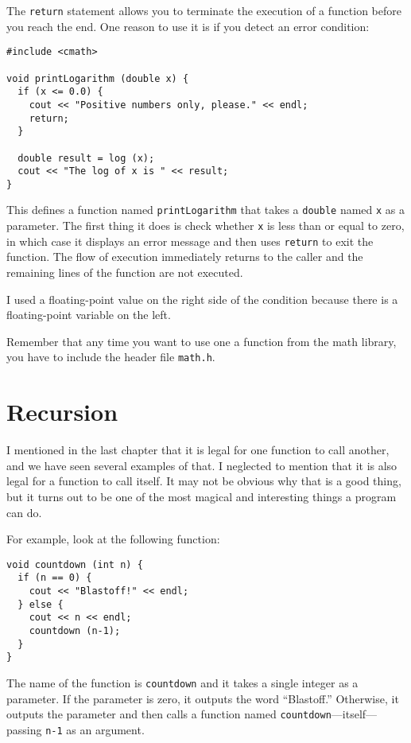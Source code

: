 The {\tt return} statement allows you to terminate the execution
of a function before you reach the end.  One reason to use it
is if you detect an error condition:

\begin{verbatim}
#include <cmath>

void printLogarithm (double x) {
  if (x <= 0.0) {
    cout << "Positive numbers only, please." << endl;
    return;
  }

  double result = log (x);
  cout << "The log of x is " << result;
}
\end{verbatim}
%
This defines a function named {\tt printLogarithm} that takes
a {\tt double} named {\tt x} as a parameter.  The first thing
it does is check whether {\tt x} is less than or equal to
zero, in which case it displays an error message and then uses
{\tt return} to exit the function.  The flow of execution
immediately returns to the caller and the remaining lines of
the function are not executed.

I used a floating-point value on the right side of the condition
because there is a floating-point variable on the left.

Remember that any time you want to use one a function from the math
library, you have to include the header file {\tt math.h}.

\section{Recursion}
\label{recursion}

I mentioned in the last chapter that it is legal for one function to
call another, and we have seen several examples of that.  I neglected
to mention that it is also legal for a function to call itself.  It
may not be obvious why that is a good thing, but it turns out to be
one of the most magical and interesting things a program can do.

For example, look at the following function:

\begin{verbatim}
void countdown (int n) {
  if (n == 0) {
    cout << "Blastoff!" << endl;
  } else {
    cout << n << endl;
    countdown (n-1);
  }
}
\end{verbatim}
%
The name of the function is {\tt countdown} and it takes a single
integer as a parameter.  If the parameter is zero, it outputs
the word ``Blastoff.''  Otherwise, it outputs the parameter and
then calls a function named {\tt countdown}---itself---passing
{\tt n-1} as an argument.

